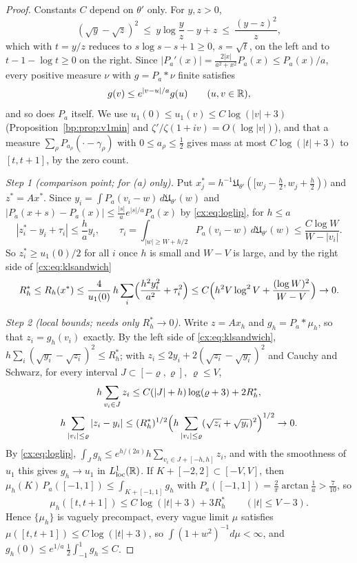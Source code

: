 \begin{proof}
Constants $C$ depend on $\theta'$ only. For $y,z>0$,
\begin{equation}\label{cx:eq:klsandwich}
(\sqrt y-\sqrt z)^2\ \le\ y\log\frac yz-y+z\ \le\ \frac{(y-z)^2}z ,
\end{equation}
which with $t=y/z$ reduces to $s\log s-s+1\ge0$, $s=\sqrt t$, on the left and to $t-1-\log t\ge0$ on the right. Since $|P_a'(x)|=\frac{2|x|}{a^2+x^2}P_a(x)\le P_a(x)/a$, every positive measure $\nu$ with $g=P_a*\nu$ finite satisfies
\begin{equation}\label{cx:eq:loglip}
g(v)\le e^{|v-u|/a}g(u)\qquad(u,v\in\mathbb{R}),
\end{equation}
and so does $P_a$ itself. We use $u_1(0)\le u_1(v)\le C\log(|v|+3)$ (Proposition~\ref{bp:prop:v1min} and $\zeta'/\zeta(1+iv)=O(\log|v|)$), and that a measure $\sum_\rho P_{a_\rho}(\cdot-\gamma_\rho)$ with $0\le a_\rho\le\frac12$ gives mass at most $C\log(|t|+3)$ to $[t,t+1]$, by the zero count.

\emph{Step 1 (comparison point; for (a) only).} Put $x_j^*=h^{-1}\mathfrak U_{\theta'}([w_j-\tfrac h2,w_j+\tfrac h2))$ and $z^*=Ax^*$. Since $y_i=\int P_a(v_i-w)\,d\mathfrak U_{\theta'}(w)$ and $|P_a(x+s)-P_a(x)|\le\frac{|s|}ae^{|s|/a}P_a(x)$ by \eqref{cx:eq:loglip}, for $h\le a$
\[
|z_i^*-y_i+\tau_i|\le\frac hay_i,\qquad\tau_i=\int_{|w|\ge W+h/2}P_a(v_i-w)\,d\mathfrak U_{\theta'}(w)\le\frac{C\log W}{W-|v_i|} .
\]
So $z_i^*\ge u_1(0)/2$ for all $i$ once $h$ is small and $W-V$ is large, and by the right side of \eqref{cx:eq:klsandwich}
\[
R_h^*\le R_h(x^*)\le\frac4{u_1(0)}\,h\sum_i\Bigl(\frac{h^2y_i^2}{a^2}+\tau_i^2\Bigr)\le C\Bigl(h^2V\log^2V+\frac{(\log W)^2}{W-V}\Bigr)\to0 .
\]

\emph{Step 2 (local bounds; needs only $R_h^*\to0$).} Write $z=Ax_h$ and $g_h=P_a*\mu_h$, so that $z_i=g_h(v_i)$ exactly. By the left side of \eqref{cx:eq:klsandwich}, $h\sum_i(\sqrt{y_i}-\sqrt{z_i})^2\le R_h^*$; with $z_i\le2y_i+2(\sqrt{z_i}-\sqrt{y_i})^2$ and Cauchy and Schwarz, for every interval $J\subset[-\varrho,\varrho]$, $\varrho\le V$,
\[
\begin{gathered}h\sum_{v_i\in J}z_i\le C(|J|+h)\log(\varrho+3)+2R_h^*,\\ h\sum_{|v_i|\le\varrho}|z_i-y_i|\le(R_h^*)^{1/2}\Bigl(h\sum_{|v_i|\le\varrho}(\sqrt{z_i}+\sqrt{y_i})^2\Bigr)^{1/2}\to0 .\end{gathered}
\]
By \eqref{cx:eq:loglip}, $\int_Jg_h\le e^{h/(2a)}h\sum_{v_i\in J+[-h,h]}z_i$, and with the smoothness of $u_1$ this gives $g_h\to u_1$ in $L^1_{\rm loc}(\mathbb{R})$. If $K+[-2,2]\subset[-V,V]$, then $\mu_h(K)\,P_a([-1,1])\le\int_{K+[-1,1]}g_h$ with $P_a([-1,1])=\frac2\pi\arctan\frac1a>\frac7{10}$, so
\[
\mu_h([t,t+1])\le C\log(|t|+3)+3R_h^*\qquad(|t|\le V-3).
\]
Hence $\{\mu_h\}$ is vaguely precompact, every vague limit $\mu$ satisfies $\mu([t,t+1])\le C\log(|t|+3)$, so $\int(1+w^2)^{-1}d\mu<\infty$, and $g_h(0)\le e^{1/a}\,\frac12\int_{-1}^1g_h\le C$.


\end{proof}
